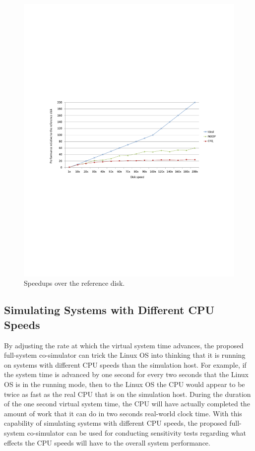 \begin{figure}[htpb]
	\centering
	\includegraphics[trim=2cm 10cm 2cm 9.5cm, width=\textwidth]{figures/ch5-speedup-over-reference.pdf}
	\caption{\label{fig:ch5-speedup-over-reference}Speedups over the reference disk.}
\end{figure}


\subsection{Simulating Systems with Different CPU Speeds}
\label{sec:ch5-different-CPU-speeds}

By adjusting the rate at which the virtual system time advances, the proposed full-system co-simulator can trick the Linux OS into thinking that it is running on systems with different CPU speeds than the simulation host. For example, if the system time is advanced by one second for every two seconds that the Linux OS is in the running mode, then to the Linux OS the CPU would appear to be twice as fast as the real CPU that is on the simulation host. During the duration of the one second virtual system time, the CPU will have actually completed the amount of work that it can do in two seconds real-world clock time. With this capability of simulating systems with different CPU speeds, the proposed full-system co-simulator can be used for conducting sensitivity tests regarding what effects the CPU speeds will have to the overall system performance.

